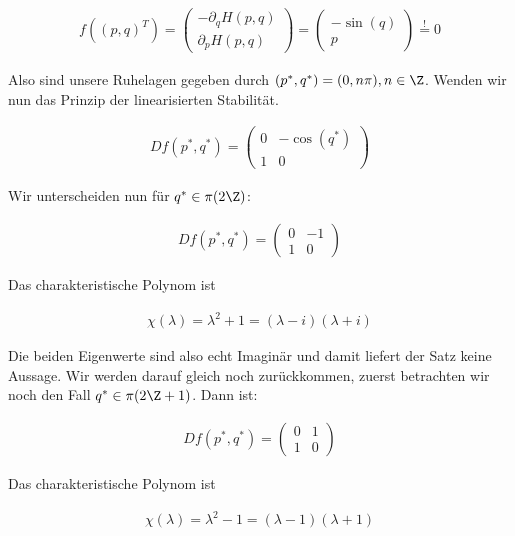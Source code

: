 \begin{solution}
\begin{align*}
  f((p,q)^T) = \left(
  \begin{array}{c}
    -\partial_q H(p,q) \\
    \partial_p H(p,q)
  \end{array}
  \right) = \left(
  \begin{array}{c}
  -\sin(q) \\
    p
  \end{array}
  \right) \stackrel{!}{=}0
\end{align*}

Also sind unsere Ruhelagen gegeben durch $(p^*,q^*)=(0,n \pi), n \in \Z$. Wenden wir
nun das Prinzip der linearisierten Stabilität.

\begin{align*}
  Df(p^*,q^*)= \left(\begin{array}{cc}
    0 & -\cos(q^*) \\
    1 & 0
  \end{array} \right)
\end{align*}

Wir unterscheiden nun für $q^* \in \pi(2\Z)$:

\begin{align*}
Df(p^*,q^*)= \left(\begin{array}{cc}
  0 & -1 \\
  1 & 0
\end{array} \right)
\end{align*}

Das charakteristische Polynom ist

\begin{align*}
  \chi(\lambda) = \lambda^2 + 1 = (\lambda -i)(\lambda +i)
\end{align*}

Die beiden Eigenwerte sind also echt Imaginär und damit liefert der Satz keine Aussage.
Wir werden darauf gleich noch zurückkommen, zuerst betrachten wir noch den Fall
$q^* \in \pi(2\Z +1)$. Dann ist:

\begin{align*}
Df(p^*,q^*)= \left(\begin{array}{cc}
  0 & 1 \\
  1 & 0
\end{array} \right)
\end{align*}

Das charakteristische Polynom ist

\begin{align*}
  \chi(\lambda) = \lambda^2 - 1 = (\lambda -1)(\lambda +1)
\end{align*}


\end{solution}
